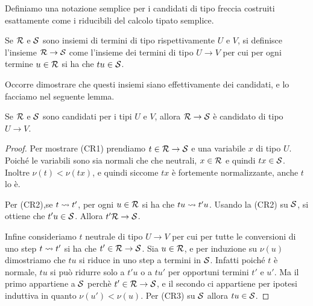\documentclass[]{marticle}
\begin{document}
Definiamo una notazione semplice per i candidati di tipo freccia costruiti
esattamente come i riducibili del calcolo tipato semplice.
\begin{block}[Definizione]
    Se $\mathcal{R}$ e $\mathcal{S}$ sono insiemi di termini di tipo rispettivamente $U$
    e $V$, si definisce l'insieme $\mathcal{R}\rightarrow\mathcal{S}$ come l'insieme dei
    termini di tipo $U\rightarrow V$ per cui per ogni termine $u\in\mathcal{R}$ si
    ha che $tu\in\mathcal{S}$.
\end{block}

Occorre dimostrare che questi insiemi siano effettivamente dei candidati, e lo
facciamo nel seguente lemma.
\begin{block} [Lemma]
    Se $\mathcal{R}$ e $\mathcal{S}$ sono candidati per i tipi $U$ e $V$, allora
    $\mathcal{R}\rightarrow\mathcal{S}$ \`e candidato di tipo $U\rightarrow V$.
\end{block}
\begin{proof}
    Per mostrare (CR1) prendiamo $t\in\mathcal{R}\rightarrow\mathcal{S}$ e una variabile
    $x$ di tipo $U$. Poich\'e le variabili sono sia normali che che neutrali,
    $x\in \mathcal{R}$ e quindi $tx\in\mathcal{S}$. Inoltre $\nu(t)<\nu(tx)$, e quindi
    siccome $tx$ \`e fortemente normalizzante, anche $t$ lo \`e.

    Per (CR2),se $t\rightsquigarrow t'$, per ogni $u \in \mathcal{R}$ si ha che $tu\rightsquigarrow
    t'u$. Usando la (CR2) su $\mathcal{S}$, si ottiene che $t'u\in\mathcal{S}$. Allora
    $t'\mathcal{R}\rightarrow\mathcal{S}$.

    Infine consideriamo $t$ neutrale di tipo $U\rightarrow V$ per cui per tutte
    le conversioni di uno step $t\rightsquigarrow t'$ si ha che $t' \in
    \mathcal{R}\rightarrow\mathcal{S}$. Sia $u\in\mathcal{R}$, e per induzione su $\nu(u)$
    dimostriamo che $tu$ si riduce in uno step a termini in $\mathcal{S}$. Infatti
    poich\'e $t$ \`e normale, $tu$ si pu\`o ridurre solo a $t'u$ o a $tu'$ per
    opportuni termini $t'$ e $u'$. Ma il primo appartiene a $\mathcal{S}$ perch\`e
    $t'\in\mathcal{R}\rightarrow\mathcal{S}$, e il secondo ci appartiene per ipotesi
    induttiva in quanto $\nu(u')<\nu(u)$. Per (CR3) su $\mathcal{S}$ allora
    $tu\in\mathcal{S}$. 
\end{proof}
\end{document}
